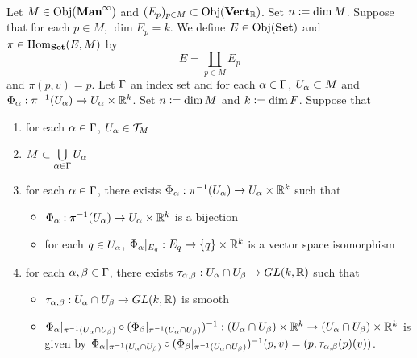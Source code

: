 \documentclass{book}
\begin{document}
\begin{ex}   \\
	Let $M \in \operatorname{Obj}(\operatorname*{\text{\textbf{Man}}^{\infty}})$ and $(E_p)_{p \in M} \subset \operatorname{Obj}(\operatorname*{\text{\textbf{Vect}}_{\mathbb{R}}})$. Set $n \vcentcolon= \dim M$. Suppose that for each $p \in M$, $\dim E_p = k$. We define $E \in \operatorname{Obj}(\operatorname*{\text{\textbf{Set}}})$ and $\pi \in \operatorname{Hom}_{\operatorname*{\text{\textbf{Set}}}}(E, M)$ by
	$$E = \coprod_{p \in M} E_p$$  
	and 
	$\pi(p, v) = p$. Let $\Gamma$ an index set and for each $\alpha \in \Gamma$, $U_{\alpha} \subset M$ and $\Phi_{\alpha}: \pi^{-1}(U_{\alpha}) \rightarrow U_{\alpha} \times \mathbb{R}^k$. Set $n \vcentcolon= \dim M$ and $k \vcentcolon= \dim F$. Suppose that
	\begin{enumerate}
		\item for each $\alpha \in \Gamma$, $U_{\alpha} \in \mathcal{T}_M$
		\item $M \subset \bigcup\limits_{\alpha \in \Gamma} U_{\alpha}$
		\item for each $\alpha \in \Gamma$, there exists $\Phi_{\alpha}: \pi^{-1}(U_{\alpha}) \rightarrow U_{\alpha} \times \mathbb{R}^k$ such that 
		\begin{itemize}
			\item $\Phi_{\alpha} : \pi^{-1}(U_{\alpha}) \rightarrow U_{\alpha} \times \mathbb{R}^k$ is a bijection 
			\item for each $q \in U_{\alpha}$, $\Phi_{\alpha}|_{E_q}:E_q \rightarrow \{q\} \times \mathbb{R}^k$ is a vector space isomorphism
		\end{itemize}
		\item for each $\alpha, \beta \in \Gamma$, there exists $\tau_{\alpha, \beta}: U_{\alpha} \cap U_{\beta} \rightarrow GL(k, \mathbb{R})$ such that 
		\begin{itemize}
			\item $\tau_{\alpha, \beta}: U_{\alpha} \cap U_{\beta} \rightarrow GL(k, \mathbb{R})$ is smooth
			\item $\Phi_{\alpha}|_{\pi^{-1}(U_{\alpha} \cap U_{\beta})} \circ (\Phi_{\beta}|_{\pi^{-1}(U_{\alpha} \cap U_{\beta})})^{-1}: (U_{\alpha} \cap U_{\beta}) \times \mathbb{R}^k \rightarrow (U_{\alpha} \cap U_{\beta}) \times \mathbb{R}^k$ is given by 
			$\Phi_{\alpha}|_{\pi^{-1}(U_{\alpha} \cap U_{\beta})} \circ (\Phi_{\beta}|_{\pi^{-1}(U_{\alpha} \cap U_{\beta})})^{-1}(p, v) = (p, \tau_{\alpha,\beta}(p)(v))$.
		\end{itemize}

\end{enumerate}
\end{ex}
\end{document}
